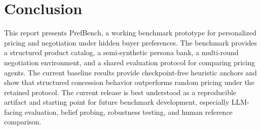 \section{Conclusion}
\label{sec:conclusion}

This report presents PrefBench, a working benchmark prototype for personalized pricing and negotiation under hidden buyer preferences. The benchmark provides a structured product catalog, a semi-synthetic persona bank, a multi-round negotiation environment, and a shared evaluation protocol for comparing pricing agents. The current baseline results provide checkpoint-free heuristic anchors and show that structured concession behavior outperforms random pricing under the retained protocol. The current release is best understood as a reproducible artifact and starting point for future benchmark development, especially LLM-facing evaluation, belief probing, robustness testing, and human reference comparison.
